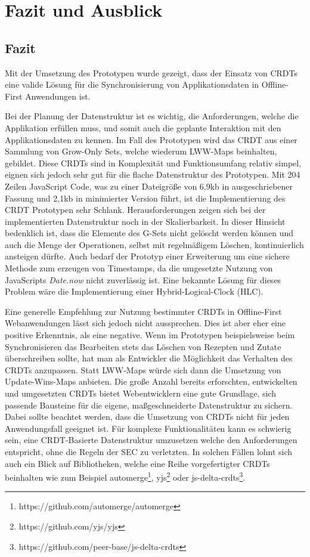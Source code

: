 \documentclass[a4paper, 12pt]{scrreprt}
\begin{document}

\chapter{Fazit und Ausblick}

\section{Fazit}

Mit der Umsetzung des Prototypen wurde gezeigt, dass der Einsatz von CRDTs eine valide Lösung für die Synchronisierung von Applikationsdaten in Offline-First Anwendungen ist.

Bei der Planung der Datenstruktur ist es wichtig, die Anforderungen, welche die Applikation erfüllen muss, und somit auch die geplante Interaktion mit den Applikationsdaten zu kennen. Im Fall des Prototypen wird das CRDT aus einer Sammlung von Grow-Only Sets, welche wiederum LWW-Maps beinhalten, gebildet. Diese CRDTs sind in Komplexität und Funktionsumfang relativ simpel, eignen sich jedoch sehr gut für die flache Datenstruktur des Prototypen. Mit 204 Zeilen JavaScript Code, was zu einer Dateigröße von 6,9kb in ausgeschriebener Fassung und 2,1kb in minimierter Version führt, ist die Implementierung des CRDT Prototypen sehr Schlank. Herausforderungen zeigen sich bei der implementierten Datenstruktur noch in der Skalierbarkeit. In dieser Hinsicht bedenklich ist, dass die Elemente des G-Sets nicht gelöscht werden können und auch die Menge der Operationen, selbst mit regelmäßigem Löschen, kontinuierlich ansteigen dürfte. Auch bedarf der Prototyp einer Erweiterung um eine sichere Methode zum erzeugen von Timestamps, da die umgesetzte Nutzung von JavaScripts \textit{Date.now} nicht zuverlässig ist. Eine bekannte Lösung für dieses Problem wäre die Implementierung einer Hybrid-Logical-Clock (HLC).

Eine generelle Empfehlung zur Nutzung bestimmter CRDTs in Offline-First Webanwendungen lässt sich jedoch nicht aussprechen. Dies ist aber eher eine positive Erkenntnis, als eine negative. Wenn im Prototypen beispielsweise beim Synchronisieren das Bearbeiten stets das Löschen von Rezepten und Zutate überschreiben sollte, hat man als Entwickler die Möglichkeit das Verhalten des CRDTs anzupassen. Statt LWW-Maps würde sich dann die Umsetzung von Update-Wins-Maps anbieten. Die große Anzahl bereits erforschten, entwickelten und umgesetzten CRDTs bietet Webentwicklern eine gute Grundlage, sich passende Bausteine für die eigene, maßgeschneiderte Datenstruktur zu sichern. Dabei sollte beachtet werden, dass die Umsetzung von CRDTs nicht für jeden Anwendungsfall geeignet ist. Für komplexe Funktionalitäten kann es schwierig sein, eine CRDT-Basierte Datenstruktur umzusetzen welche den Anforderungen entspricht, ohne die Regeln der \ac{SEC} zu verletzten. In solchen Fällen lohnt sich auch ein Blick auf Bibliotheken, welche eine Reihe vorgefertigter CRDTs beinhalten wie zum Beispiel automerge\footnote{https://github.com/automerge/automerge}, yjs\footnote{https://github.com/yjs/yjs} oder js-delta-crdts\footnote{https://github.com/peer-base/js-delta-crdts}. 
\end{document}
